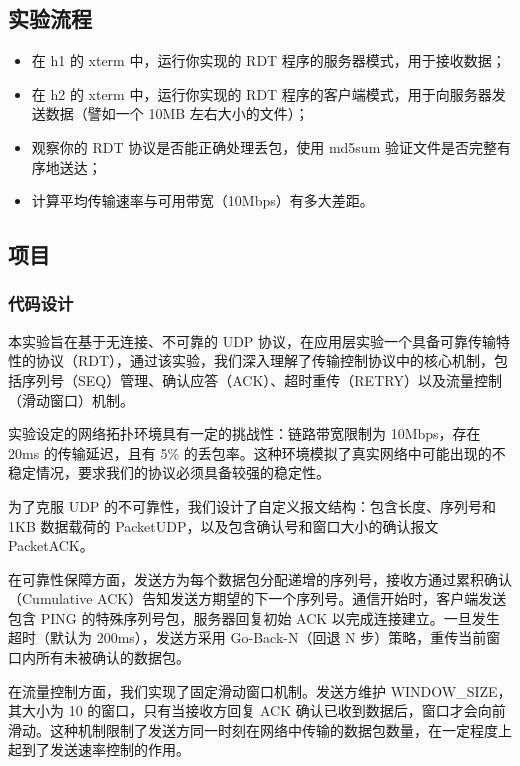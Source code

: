 \documentclass{article}
\begin{document}
\subsection{实验流程}
\begin{itemize}
    \item 在 h1 的 xterm 中，运行你实现的 RDT 程序的服务器模式，用于接收数据；
    \item 在 h2 的 xterm 中，运行你实现的 RDT 程序的客户端模式，用于向服务器发送数据（譬如一个 10MB 左右大小的文件）；
    \item 观察你的 RDT 协议是否能正确处理丢包，使用 md5sum 验证文件是否完整有序地送达；
    \item 计算平均传输速率与可用带宽（10Mbps）有多大差距。
\end{itemize}








\subsection{项目}
\subsubsection{代码设计}
本实验旨在基于无连接、不可靠的 UDP 协议，在应用层实验一个具备可靠传输特性的协议（RDT），通过该实验，我们深入理解了传输控制协议中的核心机制，包括序列号（SEQ）管理、确认应答（ACK）、超时重传（RETRY）以及流量控制（滑动窗口）机制。

实验设定的网络拓扑环境具有一定的挑战性：链路带宽限制为 10Mbps，存在 20ms 的传输延迟，且有 5\% 的丢包率。这种环境模拟了真实网络中可能出现的不稳定情况，要求我们的协议必须具备较强的稳定性。

为了克服 UDP 的不可靠性，我们设计了自定义报文结构：包含长度、序列号和 1KB 数据载荷的 PacketUDP，以及包含确认号和窗口大小的确认报文 PacketACK。

在可靠性保障方面，发送方为每个数据包分配递增的序列号，接收方通过累积确认（Cumulative ACK）告知发送方期望的下一个序列号。通信开始时，客户端发送包含 PING 的特殊序列号包，服务器回复初始 ACK 以完成连接建立。一旦发生超时（默认为 200ms），发送方采用 Go-Back-N（回退 N 步）策略，重传当前窗口内所有未被确认的数据包。

在流量控制方面，我们实现了固定滑动窗口机制。发送方维护 WINDOW\_SIZE，其大小为 10 的窗口，只有当接收方回复 ACK 确认已收到数据后，窗口才会向前滑动。这种机制限制了发送方同一时刻在网络中传输的数据包数量，在一定程度上起到了发送速率控制的作用。
\end{document}
